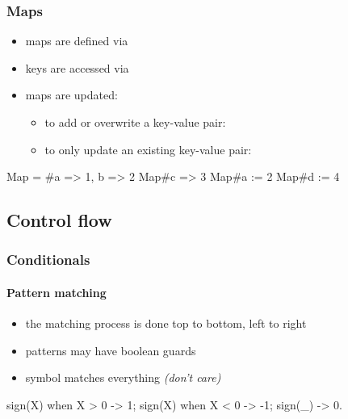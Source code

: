 \documentclass[a4paper,landscape,10pt]{article}
\begin{document}
\begin{multicols*}{2}
  \subsubsection{Maps}

  \begin{itemize}
    \item maps are defined via 
    \item keys are accessed via 
    \item maps are updated:
          \begin{itemize}
            \item to add or overwrite a key-value pair: 
            \item to only update an existing key-value pair: 
          \end{itemize}
  \end{itemize}

  \begin{erlang}
Map = #{a => 1, b => 2} %
Map#{c => 3} %
Map#{a := 2} %
Map#{d := 4} %
\end{erlang}

  \subsection{Control flow}

  \subsubsection{Conditionals}

  \paragraph{Pattern matching}

  \begin{itemize}
    \item the matching process is done top to bottom, left to right
    \item patterns may have boolean guards
    \item symbol \ierlang{_} matches everything \textit{(don't care)}
  \end{itemize}

  \begin{erlang}
sign(X) when X > 0 -> 1;
sign(X) when X < 0 -> -1;
sign(_) -> 0.
\end{erlang}


\end{multicols*}
\end{document}
